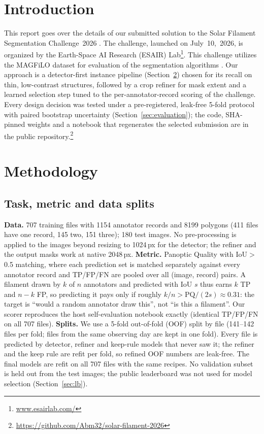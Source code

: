 \documentclass[sigconf]{acmart}
\begin{document}
\section{Introduction}
This report goes over the details of our submitted solution to the Solar Filament Segmentation Challenge~2026 \cite{filament-segmentation-2026}. The challenge, launched on July~10,~2026, is organized by the Earth-Space AI Research (ESAIR) Lab\footnote{\href{https://www.esairlab.com/home}{www.esairlab.com/}}. This challenge utilizes the MAGFiLO dataset for evaluation of the segmentation algorithms \cite{ahmadzadeh2024dataset}.
Our approach is a detector-first instance pipeline (Section~\ref{sec:methodology}) chosen for its recall on thin, low-contrast structures, followed by a crop refiner for mask extent and a learned selection step tuned to the per-annotator-record scoring of the challenge. Every design decision was tested under a pre-registered, leak-free 5-fold protocol with paired bootstrap uncertainty (Section~\ref{sec:evaluation}); the code, SHA-pinned weights and a notebook that regenerates the selected submission are in the public repository.\footnote{\url{https://github.com/Abm32/solar-filament-2026}}

\section{Methodology}\label{sec:methodology}

\subsection{Task, metric and data splits}
\textbf{Data.} 707 training files with 1154 annotator records and 8199 polygons (411 files have one record, 145 two, 151 three); 180 test images. No pre-processing is applied to the images beyond resizing to 1024\,px for the detector; the refiner and the output masks work at native 2048\,px.
\textbf{Metric.} Panoptic Quality \cite{kirillov2019panoptic} with IoU$>$0.5 matching, where each prediction set is matched separately against every annotator record and TP/FP/FN are pooled over all (image, record) pairs. A filament drawn by $k$ of $n$ annotators and predicted with IoU $s$ thus earns $k$ TP and $n-k$ FP, so predicting it pays only if roughly $k/n > \mathrm{PQ}/(2s)\approx0.31$: the target is ``would a random annotator draw this'', not ``is this a filament''. Our scorer reproduces the host self-evaluation notebook exactly (identical TP/FP/FN on all 707 files).
\textbf{Splits.} We use a 5-fold out-of-fold (OOF) split by file (141--142 files per fold; files from the same observing day are kept in one fold). Every file is predicted by detector, refiner and keep-rule models that never saw it; the refiner and the keep rule are refit per fold, so refined OOF numbers are leak-free. The final models are refit on all 707 files with the same recipes. No validation subset is held out from the test images; the public leaderboard was not used for model selection (Section~\ref{sec:lb}).
\end{document}

